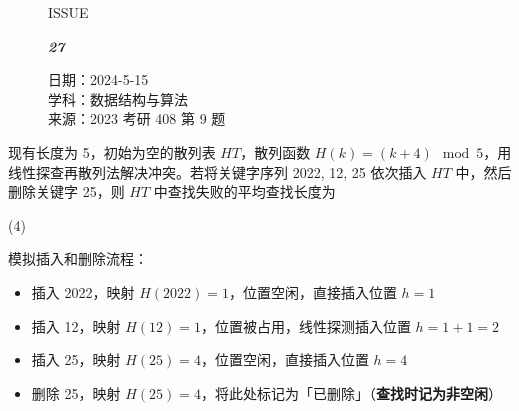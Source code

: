 \documentclass[UTF8]{ctexart}
\newcommand\Black[1]{\textcolor[gray]{0.3}{#1}}
\newcommand\Brown[1]{\textcolor[HTML]{998A4E}{#1}}
\newcommand\Emph[1]{\colorbox{green!10}{\textcolor{green!30!black}{\textbf{#1}}}}
\newcommand\IssueNumber{27}
\newcommand\Date{2024-5-15}
\newcommand\Subject{数据结构与算法}
\newcommand\Source{2023 考研 408 第 9 题}
\begin{document}
\begin{figure}[H]
\hspace{1cm}
\begin{minipage}[t]{0.3\textwidth}
\centering
    \Brown{\Genshin ISSUE}

    \vspace{-0.6cm}
    \Huge \Issue\slshape\bfseries\Black{\IssueNumber}
\end{minipage}
\hfill
\begin{minipage}[t]{0.35\textwidth}
\small
\centering
    \Brown{日期：\Date} \\
\vspace{-0.1cm}
    \Brown{学科：\Subject} \\
\vspace{-0.1cm}
    \Brown{来源：\Source}
\end{minipage}
\hspace{0.8cm}
\end{figure}

{\color{cyan!50!black}
现有长度为 5，初始为空的散列表 $HT$，散列函数 $H(k) = (k+4)\mod 5$，用线性探查再散列法解决冲突。若将关键字序列 2022, 12, 25 依次插入 $HT$ 中，然后删除关键字 25，则 $HT$ 中查找失败的平均查找长度为
\begin{tasks}(4)
\end{tasks}
}

模拟插入和删除流程：
\begin{itemize}[itemsep=0pt]
  \item 插入 2022，映射 $H(2022)=1$，位置空闲，直接插入位置 $h=1$ 
  \item 插入 12，映射 $H(12)=1$，位置被占用，线性探测插入位置 $h=1+1=2$
  \item 插入 25，映射 $H(25)=4$，位置空闲，直接插入位置 $h=4$
  \item 删除 25，映射 $H(25)=4$，将此处标记为「已删除」（\Emph{查找时记为非空闲}）
\end{itemize}

\begin{figure}[htb]
  \centering
\end{figure}
\end{document}

